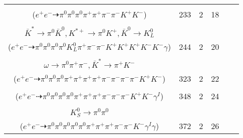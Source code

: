 \documentclass[landscape]{article}
\newcounter{rownumbers}
\newcommand\rn{\stepcounter{rownumbers}\arabic{rownumbers}}
\newcommand{\EOLP}{\\ \hline} %
\newcommand{\topoTags}[1]{#1} %
\begin{document}
\begin{longtable}{clcccc}
\rn & \makecell[l]{ $ 
e^{+} e^{-} \rightarrow \pi^{+} \pi^{-} D^{*0} \bar{D}^{*0} ,
D^{*0} \rightarrow \pi^{0} D^{0} ,
\bar{D}^{*0} \rightarrow \pi^{0} \bar{D}^{0} ,
D^{0} \rightarrow \pi^{+} K^{-} ,
\bar{D}^{0} \rightarrow \pi^{0} \pi^{-} K^{+} 
$ \\ ($
e^{+} e^{-} \dashrightarrow \pi^{0} \pi^{0} \pi^{0} \pi^{+} \pi^{+} \pi^{-} \pi^{-} K^{+} K^{-} 
$) } & \topoTags{233 & }2 & 18 \EOLP

\rn & \makecell[l]{ $ 
e^{+} e^{-} \rightarrow \bar{K}^{*} K^{+} K^{-} D^{*-} D_{s}^{*+} ,
\bar{K}^{*} \rightarrow \pi^{+} K^{-} ,
D^{*-} \rightarrow \pi^{-} \bar{D}^{0} ,
D_{s}^{*+} \rightarrow D_{s}^{+} \gamma ,
\bar{D}^{0} \rightarrow \pi^{0} \pi^{0} \pi^{-} K^{+} ,
D_{s}^{+} \rightarrow \bar{K}^{*} K^{*+} ,
$ \\ $
\bar{K}^{*} \rightarrow \pi^{0} \bar{K}^{0} ,
K^{*+} \rightarrow \pi^{0} K^{+} ,
\bar{K}^{0} \rightarrow K_{L}^{0} 
$ \\ ($
e^{+} e^{-} \dashrightarrow \pi^{0} \pi^{0} \pi^{0} \pi^{0} K_{L}^{0} \pi^{+} \pi^{-} \pi^{-} K^{+} K^{+} K^{+} K^{-} K^{-} \gamma 
$) } & \topoTags{244 & }2 & 20 \EOLP

\rn & \makecell[l]{ $ 
e^{+} e^{-} \rightarrow \rho^{0} \pi^{-} D^{*+} \bar{D}^{*0} ,
\rho^{0} \rightarrow \pi^{+} \pi^{-} ,
D^{*+} \rightarrow \pi^{+} D^{0} ,
\bar{D}^{*0} \rightarrow \pi^{0} \bar{D}^{0} ,
D^{0} \rightarrow \omega \bar{K}^{*} ,
\bar{D}^{0} \rightarrow \pi^{0} \pi^{-} K^{+} ,
$ \\ $
\omega \rightarrow \pi^{0} \pi^{+} \pi^{-} ,
\bar{K}^{*} \rightarrow \pi^{+} K^{-} 
$ \\ ($
e^{+} e^{-} \dashrightarrow \pi^{0} \pi^{0} \pi^{0} \pi^{+} \pi^{+} \pi^{+} \pi^{+} \pi^{-} \pi^{-} \pi^{-} \pi^{-} K^{+} K^{-} 
$) } & \topoTags{323 & }2 & 22 \EOLP

\rn & \makecell[l]{ $ 
e^{+} e^{-} \rightarrow \pi^{0} \pi^{0} \pi^{+} \pi^{-} D^{*+} D^{*-} \gamma^{I} ,
D^{*+} \rightarrow \pi^{+} D^{0} ,
D^{*-} \rightarrow \pi^{-} \bar{D}^{0} ,
D^{0} \rightarrow \pi^{0} \pi^{+} K^{-} ,
\bar{D}^{0} \rightarrow \pi^{0} \pi^{-} K^{+} 
$ \\ ($
e^{+} e^{-} \dashrightarrow \pi^{0} \pi^{0} \pi^{0} \pi^{0} \pi^{+} \pi^{+} \pi^{+} \pi^{-} \pi^{-} \pi^{-} K^{+} K^{-} \gamma^{I} 
$) } & \topoTags{348 & }2 & 24 \EOLP

\rn & \makecell[l]{ $ 
e^{+} e^{-} \rightarrow \pi^{+} \pi^{-} D^{*0} \bar{D}^{*0} \gamma^{I} ,
D^{*0} \rightarrow \pi^{0} D^{0} ,
\bar{D}^{*0} \rightarrow \bar{D}^{0} \gamma ,
D^{0} \rightarrow \pi^{+} \eta K^{-} ,
\bar{D}^{0} \rightarrow \pi^{0} K_{S}^{0} ,
\eta \rightarrow \pi^{0} \pi^{+} \pi^{-} ,
$ \\ $
K_{S}^{0} \rightarrow \pi^{0} \pi^{0} 
$ \\ ($
e^{+} e^{-} \dashrightarrow \pi^{0} \pi^{0} \pi^{0} \pi^{0} \pi^{0} \pi^{+} \pi^{+} \pi^{+} \pi^{-} \pi^{-} K^{-} \gamma^{I} \gamma 
$) } & \topoTags{372 & }2 & 26 \EOLP


\end{longtable}
\end{document}
